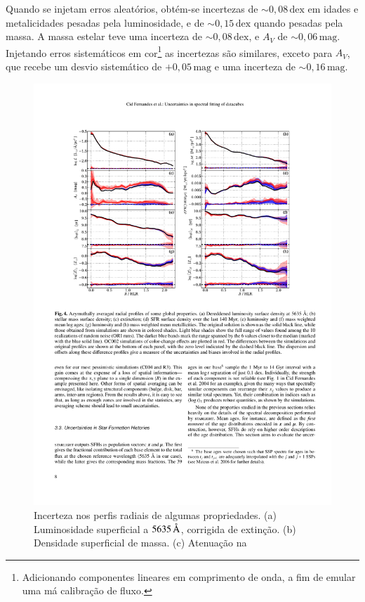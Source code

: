 Quando se injetam erros aleatórios, obtém-se incertezas de $\sim
0,08\,\mathrm{dex}$ em idades e metalicidades pesadas pela luminosidade, e de
$\sim 0,15\,\mathrm{dex}$ quando pesadas pela massa. A massa estelar teve uma
incerteza de $\sim 0,08\,\mathrm{dex}$, e $A_V$ de $\sim 0,06\,\mathrm{mag}$.
Injetando erros sistemáticos em cor\footnote{Adicionando componentes lineares em
comprimento de onda, a fim de emular uma má calibração de fluxo.} as incertezas
são similares, exceto para $A_V$, que recebe um desvio sistemático de
$+0,05\,\mathrm{mag}$ e uma incerteza de $\sim 0,16\,\mathrm{mag}$.

\begin{figure}
	\includegraphics[width=1.0\columnwidth]{figuras/resolving2}
	\caption[Incerteza nos perfis radiais] {Incerteza nos perfis radiais de
	algumas propriedades. (a) Luminosidade superficial a $5635\,\text{\normalfont\AA}$,
	corrigida de extinção. (b) Densidade superficial de massa. (c) Atenuação na
}
\end{figure}
